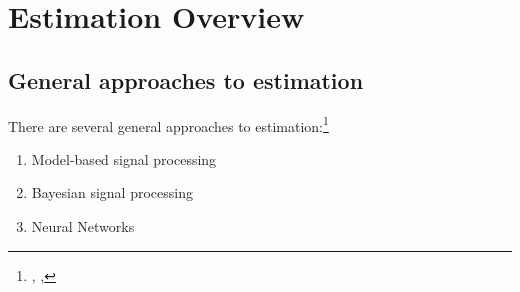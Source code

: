 
\chapter{Estimation Overview}
\label{app:est}
\label{chp:est}
\section{General approaches to estimation}
There are several general approaches to estimation:\footnote{
  ,
  ,
  }
\begin{enumerate}
  \item Model-based signal processing 
  \item Bayesian signal processing
  \item Neural Networks
\end{enumerate}

